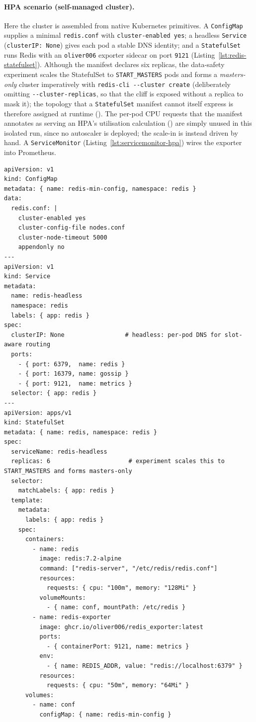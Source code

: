 \paragraph{HPA scenario (self-managed cluster).}
Here the cluster is assembled from native Kubernetes primitives. A \texttt{ConfigMap}
supplies a minimal \texttt{redis.conf} with \texttt{cluster-enabled yes}; a headless
\texttt{Service} (\texttt{clusterIP: None}) gives each pod a stable DNS identity; and a
\texttt{StatefulSet} runs Redis with an \texttt{oliver006} exporter sidecar on port
\texttt{9121} (Listing~\ref{lst:redis-statefulset}). Although the manifest declares six
replicas, the data-safety experiment scales the StatefulSet to \texttt{START\_MASTERS} pods
and forms a \emph{masters-only} cluster imperatively with
\texttt{redis-cli -{}-cluster create} (deliberately omitting \texttt{-{}-cluster-replicas}, so
that the cliff is exposed without a replica to mask it); the topology that a
\texttt{StatefulSet} manifest cannot itself express is therefore assigned at runtime
(\cite{k8s:statefulset,redis:clusterspec}). The per-pod CPU requests that the manifest
annotates as serving an HPA's utilisation calculation (\cite{k8s:hpa}) are simply unused in
this isolated run, since no autoscaler is deployed; the scale-in is instead driven by hand.
A \texttt{ServiceMonitor} (Listing~\ref{lst:servicemonitor-hpa}) wires the exporter into
Prometheus.

\begin{lstlisting}[caption={Redis \texttt{ConfigMap}, headless \texttt{Service}, and \texttt{StatefulSet} (\texttt{redis-hpa-cluster.\ac{yaml}}).},label={lst:redis-statefulset}]
apiVersion: v1
kind: ConfigMap
metadata: { name: redis-min-config, namespace: redis }
data:
  redis.conf: |
    cluster-enabled yes
    cluster-config-file nodes.conf
    cluster-node-timeout 5000
    appendonly no
---
apiVersion: v1
kind: Service
metadata:
  name: redis-headless
  namespace: redis
  labels: { app: redis }
spec:
  clusterIP: None                 # headless: per-pod DNS for slot-aware routing
  ports:
    - { port: 6379,  name: redis }
    - { port: 16379, name: gossip }
    - { port: 9121,  name: metrics }
  selector: { app: redis }
---
apiVersion: apps/v1
kind: StatefulSet
metadata: { name: redis, namespace: redis }
spec:
  serviceName: redis-headless
  replicas: 6                      # experiment scales this to START_MASTERS and forms masters-only
  selector:
    matchLabels: { app: redis }
  template:
    metadata:
      labels: { app: redis }
    spec:
      containers:
        - name: redis
          image: redis:7.2-alpine
          command: ["redis-server", "/etc/redis/redis.conf"]
          resources:
            requests: { cpu: "100m", memory: "128Mi" }
          volumeMounts:
            - { name: conf, mountPath: /etc/redis }
        - name: redis-exporter
          image: ghcr.io/oliver006/redis_exporter:latest
          ports:
            - { containerPort: 9121, name: metrics }
          env:
            - { name: REDIS_ADDR, value: "redis://localhost:6379" }
          resources:
            requests: { cpu: "50m", memory: "64Mi" }
      volumes:
        - name: conf
          configMap: { name: redis-min-config }
\end{lstlisting}

